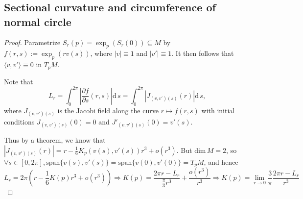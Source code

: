 
{

\subsection{Sectional curvature and circumference of normal circle}

\renewcommand*{\d}{\mathrm{d}\,} %

\begin{proof}
Parametrize $S_r(p)=\exp_p \left(S_r(0)\right) \subseteq M$ by $f(r,s):=\exp_p(r v(s))$, where $|v|\equiv 1$ and $|v'|\equiv 1$. It then follows that $\langle v,v'\rangle \equiv 0$ in $T_p M$.
\par
Note that
$$L_r = \int_{0}^{2\pi} \left|\frac{\partial f}{\partial s}(r,s) \right| \d s = \int_{0}^{2\pi} \left|J_{(v,v')(s)}(r) \right| \d s,$$
where $J_{(v,v')(s)}$ is the Jacobi field along the curve $r\mapsto f(r,s)$ with initial conditions ${J_{(v,v')(s)}(0)=0}$ and $J'_{(v,v')(s)}(0)=v'(s)$.
\par
Thus by a theorem, we know that ${ \left|J_{(v,v')(s)}(r) \right| = r-\frac{1}{6}K_p\left( v(s),v'(s) \right) r^3 + o(r^3) }$. But $\mathrm{dim}\,M=2$, so $\forall s\in[0,2\pi], \mathrm{span}\{v(s),v'(s)\} = \mathrm{span}\{v(0),v'(0)\} = T_p M$, and hence
$$L_r = 2\pi\left(r - \frac{1}{6}K(p) r^3 + o(r^3) \right) \Rightarrow K(p) = \frac{2\pi r - L_r}{\frac{\pi}{3}r^3} + \frac{o(r^3)}{r^3} \Rightarrow K(p) = \lim_{r\rightarrow 0}\frac{3}{\pi}\frac{2\pi r - L_r}{r^3}$$

\end{proof}

}
